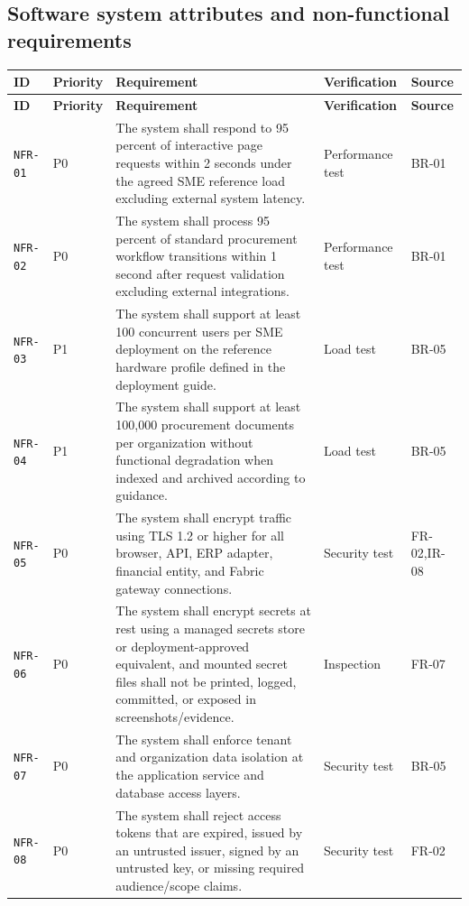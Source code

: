 \documentclass[11pt,a4paper]{article}
\begin{document}
\subsection{Software system attributes and non-functional requirements}\label{sec:nfr}
\begin{footnotesize}
\begin{longtable}{@{}p{}p{}p{}p{}p{}@{}}
\rowcolor{gray!18}\textbf{ID} & \textbf{Priority} & \textbf{Requirement} & \textbf{Verification} & \textbf{Source} \\ \hline
\endfirsthead
\rowcolor{gray!18}\textbf{ID} & \textbf{Priority} & \textbf{Requirement} & \textbf{Verification} & \textbf{Source} \\ \hline
\endhead
\texttt{NFR-01} & P0 & The system shall respond to 95 percent of interactive page requests within 2 seconds under the agreed SME reference load excluding external system latency. & Performance test & BR-01 \\ \hline
\texttt{NFR-02} & P0 & The system shall process 95 percent of standard procurement workflow transitions within 1 second after request validation excluding external integrations. & Performance test & BR-01 \\ \hline
\texttt{NFR-03} & P1 & The system shall support at least 100 concurrent users per SME deployment on the reference hardware profile defined in the deployment guide. & Load test & BR-05 \\ \hline
\texttt{NFR-04} & P1 & The system shall support at least 100,000 procurement documents per organization without functional degradation when indexed and archived according to guidance. & Load test & BR-05 \\ \hline
\texttt{NFR-05} & P0 & The system shall encrypt traffic using TLS 1.2 or higher for all browser, API, ERP adapter, financial entity, and Fabric gateway connections. & Security test & FR-02,IR-08 \\ \hline
\texttt{NFR-06} & P0 & The system shall encrypt secrets at rest using a managed secrets store or deployment-approved equivalent, and mounted secret files shall not be printed, logged, committed, or exposed in screenshots/evidence. & Inspection & FR-07 \\ \hline
\texttt{NFR-07} & P0 & The system shall enforce tenant and organization data isolation at the application service and database access layers. & Security test & BR-05 \\ \hline
\texttt{NFR-08} & P0 & The system shall reject access tokens that are expired, issued by an untrusted issuer, signed by an untrusted key, or missing required audience/scope claims. & Security test & FR-02 \\ \hline

\end{longtable}
\end{footnotesize}
\end{document}
